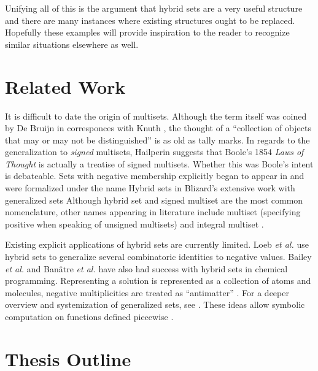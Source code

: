 Unifying all of this is the argument that hybrid sets are a very useful structure and there are many instances where existing
structures ought to be replaced.
Hopefully these examples will provide inspiration to the reader to recognize similar situations elsewhere as well.




\section{Related Work}


It is difficult to date the origin of multisets.
Although the term itself was coined by De Bruijn in corresponces with Knuth \cite{knuth2014art},
the thought of a ``collection of objects that may or may not be distinguished'' is as old as tally marks. 
In regards to the generalization to \emph{signed} multisets, Hailperin \cite{hailperin1986boole} 
suggests that Boole's 1854 \emph{Laws of Thought} \cite{boole1854investigation} is actually a treatise of signed multisets.
Whether this was Boole's intent is debateable.
Sets with negative membership explicitly began to appear in \cite{whitney1933characteristic} and were 
formalized under the name Hybrid sets in Blizard's extensive work with generalized sets \cite{blizard1988, blizard1990} 
Although hybrid set and signed multiset are the most common nomenclature, other names appearing in literature include
multiset (specifying positive when speaking of unsigned multisets) \cite{reisig1985petri} 
and integral multiset \cite{wildberger2003new}. 


Existing explicit applications of hybrid sets are currently limited.
Loeb \emph{et al.} \cite{damiani1991, loeb1992} use hybrid sets to generalize several combinatoric identities to negative values.
Bailey \emph{et al.} \cite{bailey2009hypergraphic} and Ban\^{a}tre \emph{et al.} \cite{banatre2006} 
have also had success with hybrid sets in chemical programming. 
Representing a solution is represented as a collection of atoms and molecules, 
negative multiplicities are treated as ``antimatter'' . 
For a deeper overview and systemization of generalized sets, see \cite{singh2007, singh2008systematization}.
These ideas allow symbolic computation on functions defined piecewise \cite{carette2010}.


\section{Thesis Outline}


